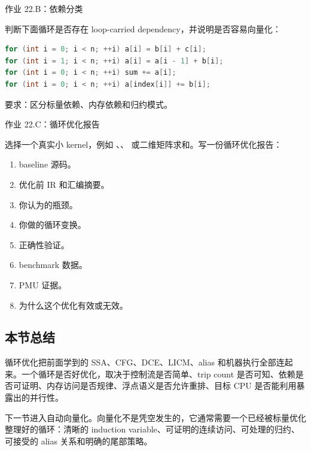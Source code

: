 \begin{exercisebox}
作业 22.B：依赖分类

判断下面循环是否存在 loop-carried dependency，并说明是否容易向量化：

\begin{lstlisting}[language=C++]
for (int i = 0; i < n; ++i) a[i] = b[i] + c[i];
for (int i = 1; i < n; ++i) a[i] = a[i - 1] + b[i];
for (int i = 0; i < n; ++i) sum += a[i];
for (int i = 0; i < n; ++i) a[index[i]] += b[i];
\end{lstlisting}

要求：区分标量依赖、内存依赖和归约模式。
\end{exercisebox}

\begin{exercisebox}
作业 22.C：循环优化报告

选择一个真实小 kernel，例如 、、 或二维矩阵求和。写一份循环优化报告：

\begin{enumerate}
  \item baseline 源码。
  \item 优化前 IR 和汇编摘要。
  \item 你认为的瓶颈。
  \item 你做的循环变换。
  \item 正确性验证。
  \item benchmark 数据。
  \item PMU 证据。
  \item 为什么这个优化有效或无效。
\end{enumerate}
\end{exercisebox}

\subsection{本节总结}

循环优化把前面学到的 SSA、CFG、DCE、LICM、alias 和机器执行全部连起来。一个循环是否好优化，取决于控制流是否简单、trip count 是否可知、依赖是否可证明、内存访问是否规律、浮点语义是否允许重排、目标 CPU 是否能利用暴露出的并行性。

下一节进入自动向量化。向量化不是凭空发生的，它通常需要一个已经被标量优化整理好的循环：清晰的 induction variable、可证明的连续访问、可处理的归约、可接受的 alias 关系和明确的尾部策略。
